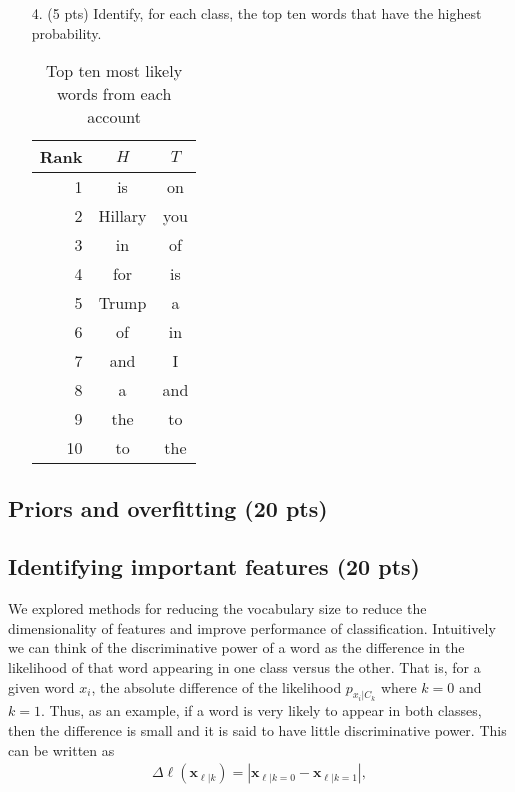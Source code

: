 \documentclass{article}
\renewcommand{\vec}[1]{\mathbf{#1}}
\begin{document}
\begin{enumerate}
\item [4.] (5 pts) Identify, for each class, the top ten words that have the highest probability.

\begin{table}[!htb]
\centering
\caption{Top ten most likely words from each account}
\begin{tabular}{|r|c|c|} \hline
	Rank & $H$ & $T$ \\ \hline
	1 & is & on \\ \hline
	2 & Hillary & you \\ \hline
	3 & in &  of \\ \hline
	4 & for & is  \\ \hline
	5 & Trump & a \\ \hline
	6 & of & in \\ \hline
	7 & and & I \\ \hline
	8 & a & and \\ \hline
	9 & the & to \\ \hline
	10 & to & the \\ \hline
\end{tabular}
\end{table}


\end{enumerate}

\subsection{Priors and overfitting (20 pts)}

\subsection{Identifying important features (20 pts)}

We explored methods for reducing the vocabulary size to reduce the dimensionality of features and improve performance of classification.  Intuitively we can think of the discriminative power of a word as the difference in the likelihood of that word appearing in one class versus the other. That is, for a given word $x_i$, the absolute difference of the likelihood $p_{x_i|C_k}$ where $k=0$ and $k=1$. Thus, as an example, if a word is very likely to appear in both classes, then the difference is small and it is said to have little discriminative power. This can be written as
\begin{align}
\Delta \ell(\vec{x}_{\ell|k}) = |\vec{x}_{\ell|k=0} - \vec{x}_{\ell|k=1}|,
\end{align}
\end{document}
